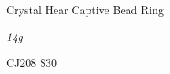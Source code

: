 \documentclass[8pt]{article}
\date{\today}
\title{}
\begin{document}
\begin{center}{\large{Crystal Hear Captive Bead Ring}}

\end{center}
\begin{center}{\Large\textit{14g}}

\end{center}
\begin{center}{\large{CJ208\hspace{25mm}  \$30}}

\end{center}
\end{document}
